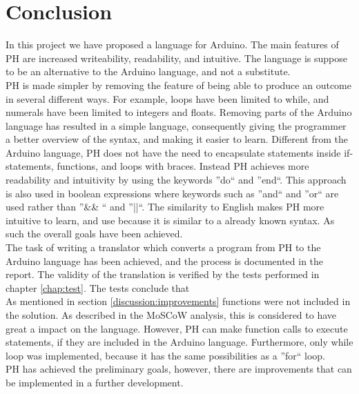 \section{Conclusion}

In this project we have proposed a language for Arduino. The main features of PH are increased writeability, readability, and intuitive. The language is suppose to be an alternative to the Arduino language, and not a substitute.\\

PH is made simpler by removing the feature of being able to produce an outcome in several different ways. For example, loops have been limited to while, and numerals have been limited to integers and floats. Removing parts of the Arduino language has resulted in a simple language, consequently giving the programmer a better overview of the syntax, and making it easier to learn. Different from the Arduino language, PH does not have the need to encapsulate statements inside if-statements, functions, and loops with braces. Instead PH achieves more readability and intuitivity by using the keywords ''do`` and ''end``. This approach is also used in boolean expressions where keywords such as ''and`` and ''or`` are used rather than ''\&\& `` and ''||``. The similarity to English makes PH more intuitive to learn, and use because it is similar to a already known syntax. As such the overall goals have been achieved. \\
The task of writing a translator which converts a program from PH to the Arduino language has been achieved, and the process is documented in the report. The validity of the translation is verified by the tests performed in
chapter \ref{chap:test}. The tests conclude that  \\
As mentioned in section \ref{discussion:improvements} functions were not included in the solution. As described in the MoSCoW analysis, this is considered to have great a impact on the language. However, PH can make function calls to execute statements, if they are included in the Arduino language. Furthermore, only while loop was implemented, because it has the same possibilities as a ''for`` loop. \\

PH has achieved the preliminary goals, however, there are improvements that can be implemented in a further development.\\
